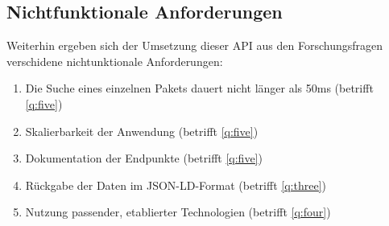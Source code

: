 \subsection{Nichtfunktionale Anforderungen} \label{sec:N_Anforderungen}
    Weiterhin ergeben sich der Umsetzung dieser \ac{API} aus den Forschungsfragen verschidene nichtunktionale Anforderungen:
    \begin{enumerate}[label=\textbf{NFRQ-\Roman*}, leftmargin=2.5cm]
        \item Die Suche eines einzelnen Pakets dauert nicht länger als 50ms (betrifft \ref{q:five}) \label{nf:one}
        \item Skalierbarkeit der Anwendung (betrifft \ref{q:five}) \label{nf:two}
        \item Dokumentation der Endpunkte (betrifft \ref{q:five}) \label{nf:three}
        \item Rückgabe der Daten im \acs{JSON-LD}-Format (betrifft \ref{q:three}) \label{nf:four}
        \item Nutzung passender, etablierter Technologien (betrifft \ref{q:four}) \label{nf:five}
    \end{enumerate}